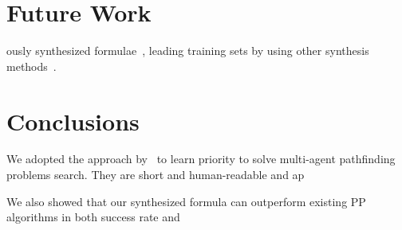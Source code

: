 \documentclass[letterpaper]{article} %
\begin{document}
\section{Future Work}

     ously synthesized formulae~\cite{bulitko2022portability}, leading   training sets by using other synthesis methods~\citep{shah2022near,mapElites,Gallotta_2022,FI2Pop}.

\section{Conclusions}
\label{sec:conclusions}

We adopted the approach by~\citet{bulitko2022portability} to learn priority to solve multi-agent pathfinding problems   search. They are short and human-readable and  ap 

We also showed that our synthesized formula can outperform existing PP algorithms in both success rate and   

\section*{}



\clearpage

\end{document}
